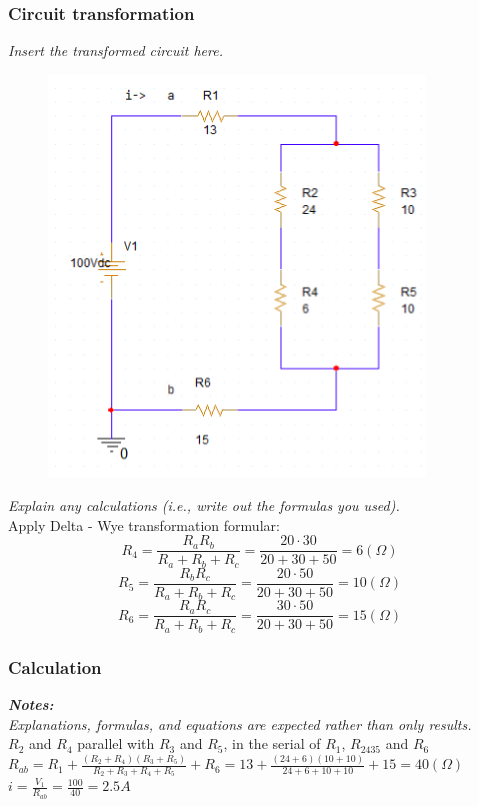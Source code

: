 \subsubsection{Circuit transformation}
\textit{Insert the transformed circuit here.}
\begin{figure}[H]
    \centering
    \includegraphics[width = 10cm]{source/picture/bai_1/ex6_rearrange.png}
\end{figure}
\newpage
\textit{Explain any calculations (i.e., write out the formulas you used).}\\
\bigskip
Apply Delta - Wye transformation formular:
$$ R_4 = \frac{R_aR_b}{R_a + R_b + R_c} = \frac{20\cdot 30}{20 + 30 + 50} = 6 (\Omega)$$
$$ R_5 = \frac{R_bR_c}{R_a + R_b + R_c} = \frac{20\cdot 50}{20 + 30 + 50} = 10(\Omega)$$
$$ R_6 = \frac{R_aR_c}{R_a + R_b + R_c} = \frac{30\cdot 50}{20 + 30 + 50} = 15(\Omega)$$
\bigskip


\subsubsection{Calculation}
\textit{\textbf{Notes:}}\\
\textit{Explanations, formulas, and equations are expected rather than only results.}\bigskip\\

$R_2$ and $R_4$ parallel with $R_3$ and $R_5$, in the serial of $R_1$, $R_{2435}$ and $R_6$ \bigskip\\
$R_{ab} = R_1 + \frac{(R_2+R_4)(R_3 + R_5)}{R_2+R_3+R_4+R_5} + R_6= 13 + \frac{(24+6)(10 + 10)}{24+6+10+10} + 15  =  40 (\Omega)$\dotfill\bigskip\\
$i = \frac{V_1}{R_{ab}} = \frac{100}{40} = 2.5 A$\dotfill\bigskip

